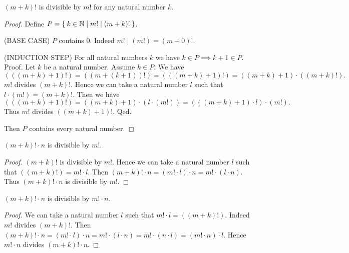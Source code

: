 \documentclass[../../arithmetic.ftl.tex]{subfiles}
\begin{document}
  \begin{forthel}
    \begin{proposition}\label{Arithmetic_03_06_805525}
      $(m + k)!$ is divisible by $m!$ for any natural number $k$.
    \end{proposition}
    \begin{proof}
      Define $P = \Set{k \in \mathbb{N} | m! \mid (m + k)!}$.

      (BASE CASE) $P$ contains $0$.
      Indeed $m! \mid (m!) = (m + 0)!$.

      (INDUCTION STEP) For all natural numbers $k$ we have $k \in P \implies k + 1 \in P$. \\
      Proof.
        Let $k$ be a natural number.
        Assume $k \in P$.
        We have
        \[  (((m + k) + 1)!)
            = ((m + (k + 1))!)
            = (((m + k) + 1)!)
            = ((m + k) + 1) \cdot ((m + k)!). \]
        $m!$ divides $(m + k)!$.
        Hence we can take a natural number $l$ such that $l \cdot (m!) = (m + k)!$.
        Then we have
        \[  (((m + k) + 1)!)
            = ((m + k) + 1) \cdot (l \cdot (m!))
            = (((m + k) + 1) \cdot l) \cdot (m!). \]
        Thus $m!$ divides $((m + k) + 1)!$.
      Qed.

      Then $P$ contains every natural number.
    \end{proof}

    \begin{corollary}\label{Arithmetic_03_06_797409}
      $(m + k)! \cdot n$ is divisible by $m!$.
    \end{corollary}
    \begin{proof}
      $(m + k)!$ is divisible by $m!$.
      Hence we can take a natural number $l$ such that $((m + k)!) = m! \cdot l$.
      Then $(m + k)! \cdot n = (m! \cdot l) \cdot n = m! \cdot (l \cdot n)$.
      Thus $(m + k)! \cdot n$ is divisible by $m!$.
    \end{proof}

    \begin{corollary}\label{Arithmetic_03_06_319523}
      $(m + k)! \cdot n$ is divisible by $m! \cdot n$.
    \end{corollary}
    \begin{proof}
      We can take a natural number $l$ such that $m! \cdot l = ((m + k)!)$.
      Indeed $m!$ divides $(m + k)!$.
      Then $(m + k)! \cdot n = (m! \cdot l) \cdot n = m! \cdot (l \cdot n) = m! \cdot (n \cdot l) = (m! \cdot n) \cdot l$.
      Hence $m! \cdot n$ divides $(m + k)! \cdot n$.
    \end{proof}


\end{forthel}
\end{document}

